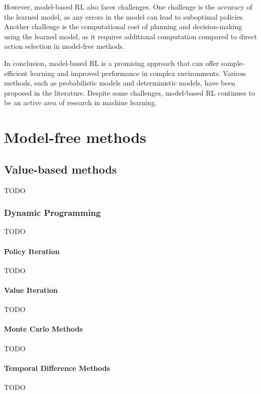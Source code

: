 \documentclass[../chapters.tex]{subfiles}
\begin{document}
    However, model-based RL also faces challenges.
    One challenge is the accuracy of the learned model, as any errors in the model can lead to suboptimal policies.
    Another challenge is the computational cost of planning and decision-making using the learned model, as it requires additional computation compared to direct action selection in model-free methods.

    In conclusion, model-based RL is a promising approach that can offer sample-efficient learning and improved performance in complex environments.
    Various methods, such as probabilistic models and deterministic models, have been proposed in the literature.
    Despite some challenges, model-based RL continues to be an active area of research in machine learning.


    \section{Model-free methods}

    \subsection{Value-based methods}
    TODO

    \subsubsection{Dynamic Programming}\label{subsubsec:dynamic-programming}
    TODO

    \paragraph{Policy Iteration}\label{par:policy-iteration}
    TODO

    \paragraph{Value Iteration}\label{par:value-iteration}
    TODO

    \paragraph{Monte Carlo Methods}\label{par:monte-carlo-methods}
    TODO

    \paragraph{Temporal Difference Methods}\label{par:temporal-difference-methods}
    TODO
\end{document}
